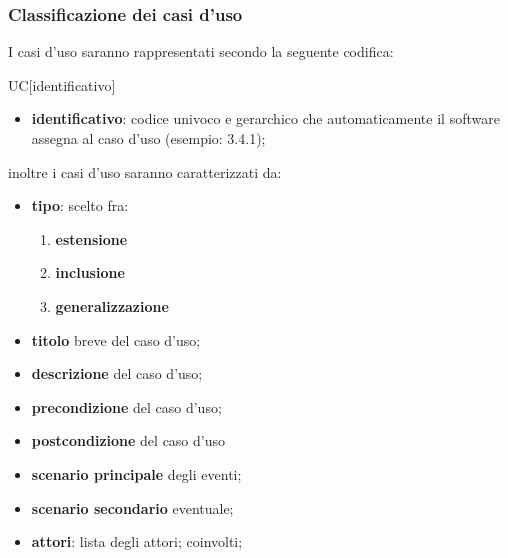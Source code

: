 		\subsubsection{Classificazione dei casi d'uso}
		I casi d'uso saranno rappresentati secondo la seguente codifica:
		\begin{center}
			UC[identificativo]
		\end{center}
		\begin{itemize}
			\item \textbf{identificativo}: codice univoco e gerarchico che automaticamente il software assegna al caso d'uso (esempio: 3.4.1);
		\end{itemize}
		inoltre i casi d'uso saranno caratterizzati da:
		\begin{itemize}
			\item \textbf{tipo}: scelto fra:
			\begin{enumerate}
				\item \textbf{estensione}
				\item \textbf{inclusione}
				\item \textbf{generalizzazione}
			\end{enumerate}
			\item \textbf{titolo} breve del caso d'uso;
			\item \textbf{descrizione} del caso d'uso;
			\item \textbf{precondizione} del caso d'uso;
			\item \textbf{postcondizione} del caso d'uso 
			\item \textbf{scenario principale} degli eventi;
			\item \textbf{scenario secondario} eventuale;
			\item \textbf{attori}: lista degli attori; coinvolti;
		\end{itemize}